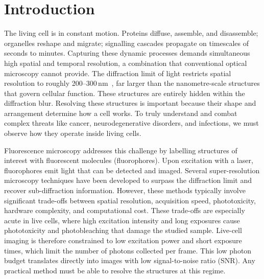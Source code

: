 \chapter{Introduction}
\label{chapter:introduction}

The living cell is in constant motion.
Proteins diffuse, assemble, and disassemble; organelles reshape and migrate;
signalling cascades propagate on timescales of seconds to minutes.
Capturing these dynamic processes demands simultaneous high spatial and temporal
resolution, a combination that conventional optical microscopy cannot provide.
The diffraction limit of light restricts spatial resolution to roughly
200--300\,nm~\cite{born1999principles}, far larger than the nanometre-scale
structures that govern cellular function. These structures are entirely hidden within the
diffraction blur.
Resolving these structures is important because their shape
and arrangement determine how a cell works. To truly understand and combat complex threats
like cancer, neurodegenerative disorders, and infections, we must observe how they operate
inside living cells.


Fluorescence microscopy addresses this challenge by labelling structures of 
interest with fluorescent molecules (fluorophores). Upon excitation with a laser, 
fluorophores emit light that can be detected and imaged. 
Several super-resolution microscopy techniques have been developed to surpass
the diffraction limit and recover sub-diffraction information.
However, these methods typically involve significant trade-offs between
spatial resolution, acquisition speed, phototoxicity, hardware complexity,
and computational cost.
These trade-offs are especially acute in live cells, where high excitation
intensity and long exposures cause phototoxicity and photobleaching that damage
the studied sample. Live-cell imaging is therefore constrained to low
excitation power and short exposure times, which limit the number of photons
collected per frame. This
low photon budget translates directly into images with
low signal-to-noise ratio (SNR).
Any practical method must be able to resolve the structures at this regime.

